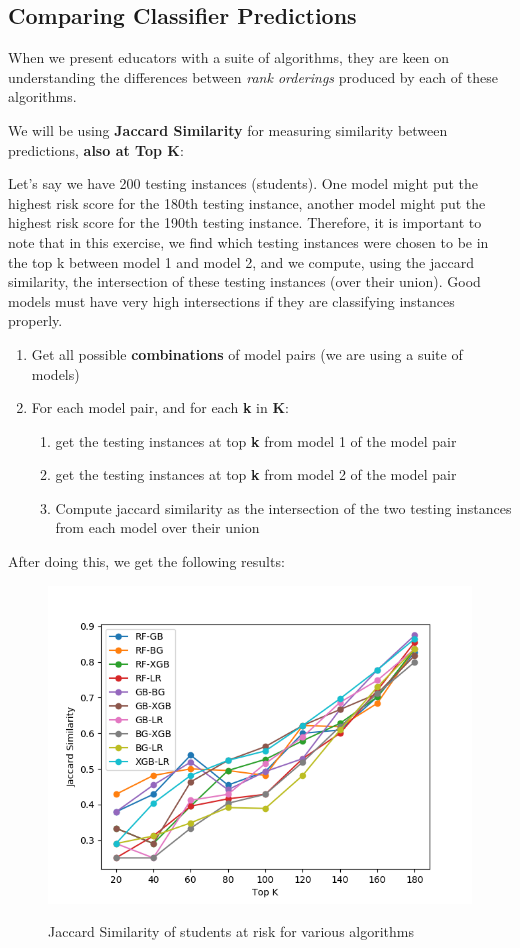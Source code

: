 \documentclass{article}
\begin{document}
\subsection{Comparing Classifier Predictions}
When we present educators with a suite of algorithms, they are keen on understanding the differences between \textit{rank orderings} produced by each of these algorithms.

\noindent We will be using \textbf{Jaccard Similarity} for measuring similarity between predictions, \textbf{also at Top K}:

Let's say we have 200 testing instances (students). One model might put the highest risk score for the 180th testing instance, another model might put the highest risk score for the 190th testing instance. Therefore, it is important to note that in this exercise, we find which testing instances were chosen to be in the top k between model 1 and model 2, and we compute, using the jaccard similarity, the intersection of these testing instances (over their union). Good models must have very high intersections if they are classifying instances properly.
 
\begin{enumerate}
\item Get all possible \textbf{combinations} of model pairs (we are using a suite of models)
\item For each model pair, and for each \textbf{k} in \textbf{K}:
\begin{enumerate}
\item get the testing instances at top \textbf{k} from model 1 of the model pair
\item get the testing instances at top \textbf{k} from model 2 of the model pair
\item Compute jaccard similarity as the intersection of the two testing instances from each model over their union
\end{enumerate}
\end{enumerate}

After doing this, we get the following results:
\begin{figure}[H]
\centering
\includegraphics[scale=0.6]{plots/toydata/jaccardtopK.png}
\label{Fig:jaccardtopk}
\caption{Jaccard Similarity of students at risk for various algorithms}
\end{figure}
\end{document}
